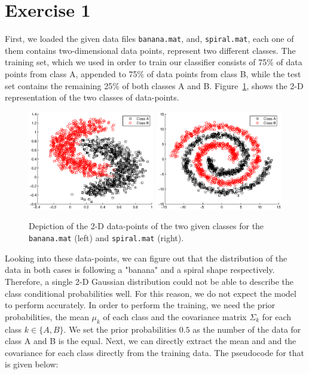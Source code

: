 \documentclass[a4paper,11pt]{article}
\begin{document}
\section*{Exercise 1}

First, we loaded the given data files \texttt{banana.mat}, and, \texttt{spiral.mat}, each one of them contains two-dimensional data points, represent two different classes. The training set, which we used in order to train our classifier consists of 75\% of data points from class A, appended to 75\% of data points from class B, while the test set contains the remaining 25\% of both classes A and B. Figure~\ref{fig1}, shows the 2-D representation of the two classes of data-points.

\begin{figure}[h!]
  \centering   
      \includegraphics[width=0.49\textwidth]{figures/ABclasses.eps}\		
      \includegraphics[width=0.49\textwidth]{figures/ABclassesSp.eps}
      
  \caption{Depiction of the 2-D data-points of the two given classes for the \texttt{banana.mat} (left) and \texttt{spiral.mat} (right).}
  \label{fig1}
\end{figure}

Looking into these data-points, we can figure out that the distribution of the data in both cases is following a "banana" and a spiral shape respectively. Therefore, a single 2-D Gaussian distribution could not be able to describe the class conditional probabilities well. For this reason, we do not expect the model to perform accurately. In order to perform the training, we need the prior probabilities, the mean $\mu_k$ of each class and the covariance matrix $\Sigma_k$  for each class $k \in \{A, B\}$. We set the prior probabilities $0.5$ as the number of the data for class A and B is the equal. Next, we can directly extract the mean and and the covariance for each class directly from the training data. The pseudocode for that is given below:\\
\end{document}
